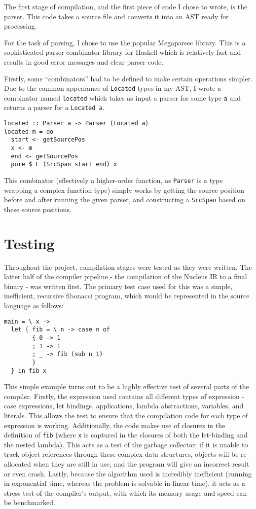 \documentclass[9pt]{extarticle}
\begin{document}
The first stage of compilation, and the first piece of code I chose to
wrote, is the parser. This code takes a source file and converts it into
an AST ready for processing.

For the task of parsing, I chose to use the popular Megaparsec library.
This is a sophisticated parser combinator library for Haskell which is
relatively fast and results in good error messages and clear parser
code.

Firstly, some ``combinators'' had to be defined to make certain
operations simpler. Due to the common appearance of \verb'Located' types
in my AST, I wrote a combinator named \verb'located' which takes as
input a parser for some type \verb'a' and returns a parser for a
\verb'Located a'.

\begin{verbatim}
located :: Parser a -> Parser (Located a)
located m = do
  start <- getSourcePos
  x <- m
  end <- getSourcePos
  pure $ L (SrcSpan start end) x
\end{verbatim}

This combinator (effectively a higher-order function, as \verb'Parser'
is a type wrapping a complex function type) simply works by getting the
source position before and after running the given parser, and
constructing a \verb'SrcSpan' based on these source positions.

\section{Testing}

Throughout the project, compilation stages were tested as they were
written. The latter half of the compiler pipeline - the compilation of
the Nucleus IR to a final binary - was written first. The primary test
case used for this was a simple, inefficient, recursive fibonacci
program, which would be represented in the source language as follows:

\begin{verbatim}
main = \ x ->
  let { fib = \ n -> case n of
        { 0 -> 1
        ; 1 -> 1
        ; _ -> fib (sub n 1)
        }
  } in fib x
\end{verbatim}

This simple example turns out to be a highly effective test of several
parts of the compiler. Firstly, the expression used contains all
different types of expression - case expressions, let bindings,
applications, lambda abstractions, variables, and literals. This allows
the test to ensure that the compilation code for each type of expression
is working. Additionally, the code makes use of closures in the
definition of \verb'fib' (where \verb'x' is captured in the closures of
both the let-binding and the nested lambda). This acts as a test of the
garbage collector; if it is unable to track object references through
these complex data structures, objects will be re-allocated when they
are still in use, and the program will give an incorrect result or even
crash. Lastly, because the algorithm used is incredibly inefficient
(running in exponential time, whereas the problem is solvable in linear
time), it acts as a stress-test of the compiler's output, with which its
memory usage and speed can be benchmarked.
\end{document}

